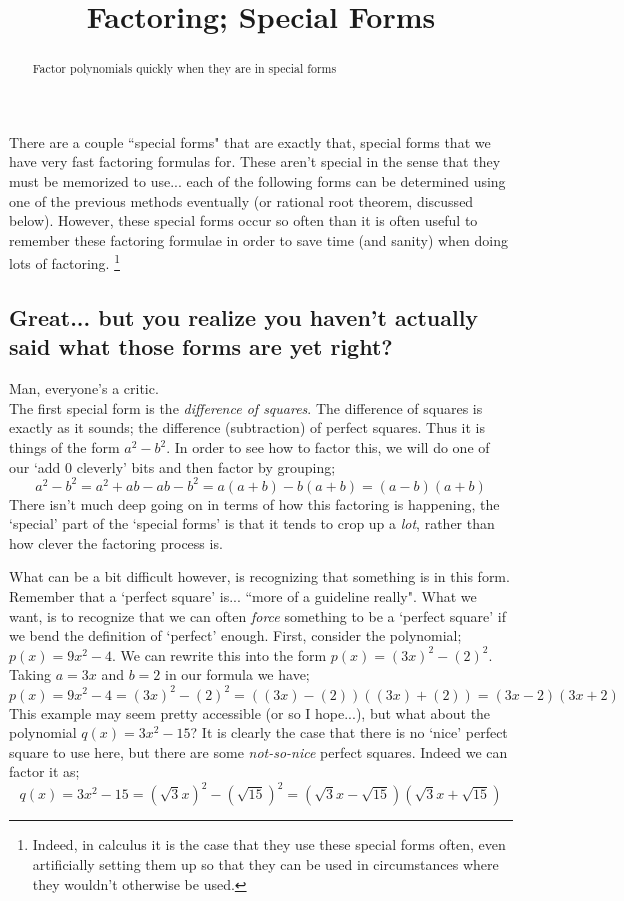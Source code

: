 \documentclass{ximeraXloud}
\title{Factoring; Special Forms}
\begin{document}
\begin{abstract}
    Factor polynomials quickly when they are in special forms
\end{abstract}
\maketitle

There are a couple ``special forms" that are exactly that, special forms that we have very fast factoring formulas for. These aren't special in the sense that they must be memorized to use... each of the following forms can be determined using one of the previous methods eventually (or rational root theorem, discussed below). However, these special forms occur so often than it is often useful to remember these factoring formulae in order to save time (and sanity) when doing lots of factoring.%
\footnote{%
    Indeed, in calculus it is the case that they use these special forms often, even artificially setting them up so that they can be used in circumstances where they wouldn't otherwise be used.
    }%

\subsection*{Great... but you realize you haven't actually said what those forms are yet right?}
    Man, everyone's a critic. \\
    The first special form is the \textit{difference of squares}. The difference of squares is exactly as it sounds; the difference (subtraction) of perfect squares. Thus it is things of the form $a^2 - b^2$. In order to see how to factor this, we will do one of our `add 0 cleverly' bits and then factor by grouping;
    \[
        a^2 - b^2 = a^2 + ab - ab - b^2
        = a(a + b) - b(a + b)
        = (a - b)(a + b)
    \]
    There isn't much deep going on in terms of how this factoring is happening, the `special' part of the `special forms' is that it tends to crop up a \textit{lot}, rather than how clever the factoring process is.
    
    What can be a bit difficult however, is recognizing that something is in this form. Remember that a `perfect square' is... ``more of a guideline really". What we want, is to recognize that we can often \textit{force} something to be a `perfect square' if we bend the definition of `perfect' enough. First, consider the polynomial; $p(x) = 9x^2 - 4$. We can rewrite this into the form $p(x) = (3x)^2 - (2)^2$. Taking $a = 3x$ and $b = 2$ in our formula we have;
    \[
        p(x) = 9x^2 - 4
        = (3x)^2 - (2)^2
        = ((3x) - (2))((3x) + (2))
        = (3x - 2)(3x + 2)
    \]
    This example may seem pretty accessible (or so I hope...), but what about the polynomial $q(x) = 3x^2 - 15$? It is clearly the case that there is no `nice' perfect square to use here, but there are some \textit{not-so-nice} perfect squares. Indeed we can factor it as;
    \[
        q(x) = 3x^2 - 15
        = (\sqrt{3}x)^2 - (\sqrt{15})^2
        = (\sqrt{3}x - \sqrt{15})(\sqrt{3}x + \sqrt{15})
    \]
    
\end{document}
